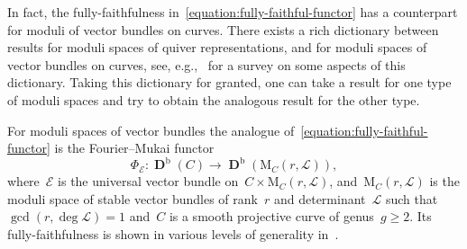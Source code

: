 \documentclass[11pt]{article}
\theoremstyle{plain}
\theoremstyle{definition}
\DeclareMathOperator\derived{\mathbf{D}}
\newcommand\bounded{\ensuremath{\mathrm{b}}}
\begin{document}
In fact, the fully-faithfulness in~\eqref{equation:fully-faithful-functor}
has a counterpart for moduli of vector bundles on curves.
There exists a rich dictionary between
results for moduli spaces of quiver representations,
and for moduli spaces of vector bundles on curves,
see, e.g.,~\cite{MR3882963} for a survey on some aspects of this dictionary.
Taking this dictionary for granted,
one can take a result for one type of moduli spaces
and try to obtain the analogous result for the other type.

For moduli spaces of vector bundles
the analogue of~\eqref{equation:fully-faithful-functor}
is the Fourier--Mukai functor
\begin{equation*}
\Phi_{\mathcal{E}}\colon\derived^\bounded(C)\to\derived^\bounded(\mathrm{M}_C(r,\mathcal{L})),
\end{equation*}
where~$\mathcal{E}$ is the universal vector bundle on~$C\times\mathrm{M}_C(r,\mathcal{L})$,
and~$\mathrm{M}_C(r,\mathcal{L})$ is the moduli space of
stable vector bundles of rank~$r$ and determinant~$\mathcal{L}$
such that~$\gcd(r,\deg\mathcal{L})=1$
and~$C$ is a smooth projective curve of genus~$g\geq 2$.
Its fully-faithfulness is shown in various levels of generality in~\cite{MR3764066,MR3954042,MR3713871,MR4651618}.
\end{document}
